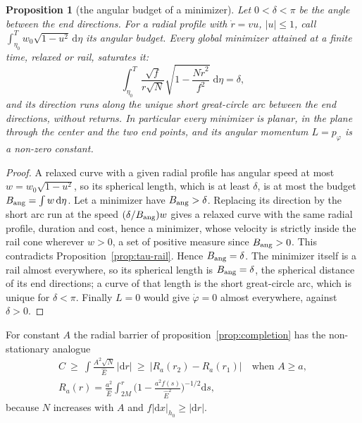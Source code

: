 \documentclass[aip,jmp,amsmath,amssymb,reprint]{revtex4-2}
\newcommand{\Ehat}{\hat E}
\newcommand{\dd}{\mathrm{d}}
\theoremstyle{plain}
\newtheorem{proposition}{Proposition}[section]
\theoremstyle{definition}
\begin{document}
\begin{proposition}[the angular budget of a minimizer]\label{prop:tau-budget}
Let $0<\delta<\pi$ be the angle between the end directions. For a radial profile with $\dot r=vu$,
$|u|\le1$, call $\int_{\eta_0}^Tw_0\sqrt{1-u^2}\,\dd\eta$ its angular budget. Every global minimizer
attained at a finite time, relaxed or rail, saturates it:
\[
  \int_{\eta_0}^{T}\frac{\sqrt f}{r\sqrt N}\sqrt{1-\frac{N\dot r^2}{f^2}}\;\dd\eta=\delta ,
\]
and its direction runs along the unique short great-circle arc between the end directions,
without returns. In particular every minimizer is planar, in the plane through the center and the
two end points, and its angular momentum $L=p_\varphi$ is a non-zero constant.
\end{proposition}

\begin{proof}
A relaxed curve with a given radial profile has angular speed at most $w=w_0\sqrt{1-u^2}$, so its
spherical length, which is at least $\delta$, is at most the budget $B_{\rm ang}=\int w\,\dd\eta$. Let a
minimizer have $B_{\rm ang}>\delta$. Replacing its direction by the short arc run at the speed
$(\delta/B_{\rm ang})w$ gives a relaxed curve with the same radial profile, duration and cost, hence a
minimizer, whose velocity is strictly inside the rail cone wherever $w>0$, a set of positive
measure since $B_{\rm ang}>0$. This contradicts Proposition~\ref{prop:tau-rail}. Hence $B_{\rm ang}=\delta$.
The minimizer itself is a rail almost everywhere, so its spherical length is $B_{\rm ang}=\delta$, the
spherical distance of its end directions; a curve of that length is the short great-circle arc,
which is unique for $\delta<\pi$. Finally $L=0$ would give $\dot\varphi=0$ almost everywhere, against
$\delta>0$.
\end{proof}

For constant $A$ the radial barrier of proposition~\ref{prop:completion} has the
non-stationary analogue
\begin{equation}
\begin{gathered}
  C\ \ge\ \int\frac{A^2\sqrt N}{\Ehat}\,|\dd r|
  \ \ge\ \bigl|R_a(r_2)-R_a(r_1)\bigr|\quad\text{when }A\ge a,\\
  R_a(r)=\frac{a^2}{\Ehat}\int_{2M}^r\Big(1-\frac{a^2f(s)}{\Ehat^2}\Big)^{-1/2}\dd s,
\end{gathered}
  \label{eq:Ra-barrier}
\end{equation}
because $N$ increases with $A$ and $f|\dd x|_{h_0}\ge|\dd r|$.
\end{document}
